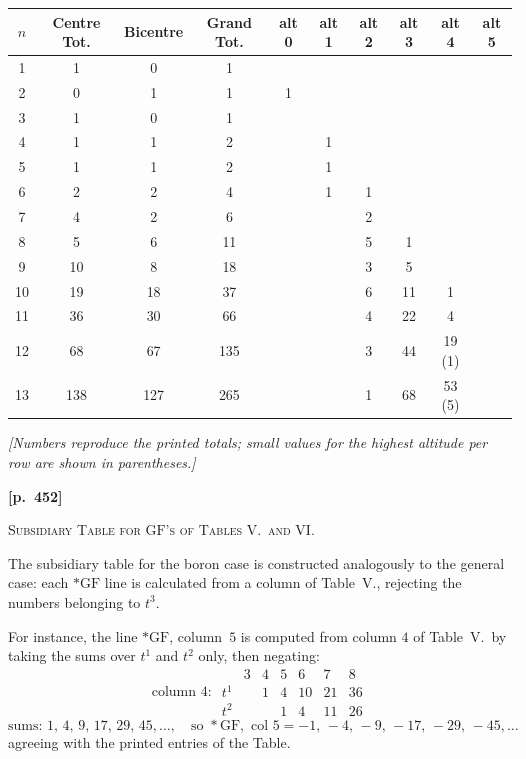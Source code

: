 \documentclass[11pt,a4paper]{article}
\providecommand{\GF}{\mathrm{GF}}
\begin{document}
\begin{center}
\begin{tabular}{c|cc|c|cccccc}
$n$ & Centre Tot. & Bicentre & Grand Tot. & alt 0 & alt 1 & alt 2 & alt 3 & alt 4 & alt 5\\\hline
1 & 1 & 0 & 1 & & & & & &\\
2 & 0 & 1 & 1 & 1 & & & & &\\
3 & 1 & 0 & 1 & & & & & &\\
4 & 1 & 1 & 2 & & 1 & & & &\\
5 & 1 & 1 & 2 & & 1 & & & &\\
6 & 2 & 2 & 4 & & 1 & 1 & & &\\
7 & 4 & 2 & 6 & & & 2 & & &\\
8 & 5 & 6 & 11 & & & 5 & 1 & &\\
9 & 10 & 8 & 18 & & & 3 & 5 & &\\
10 & 19 & 18 & 37 & & & 6 & 11 & 1 &\\
11 & 36 & 30 & 66 & & & 4 & 22 & 4 &\\
12 & 68 & 67 & 135 & & & 3 & 44 & 19 \quad (1)\\
13 & 138 & 127 & 265 & & & 1 & 68 & 53 \quad (5)
\end{tabular}
\end{center}

\noindent\textit{[Numbers reproduce the printed totals; small values for the highest altitude per row are shown in parentheses.]}

\newpage
\noindent\textbf{[p.~452]}\quad
\begin{center}
\textsc{Subsidiary Table for $\GF$'s of Tables V.\ and VI.}
\end{center}

\noindent The subsidiary table for the boron case is constructed analogously to the general case: each $*\GF$ line is calculated from a column of Table~V., rejecting the numbers belonging to $t^{3}$.

For instance, the line $*\GF$, column~$5$ is computed from column $4$ of Table~V.\ by taking the sums over $t^{1}$ and $t^{2}$ only, then negating:
\[
\text{column 4: }
\begin{array}{l|cccccc}
& 3 & 4 & 5 & 6 & 7 & 8\\\hline
t^{1} & & 1 & 4 & 10 & 21 & 36\\
t^{2} & & & 1 & 4 & 11 & 26
\end{array}
\]
\[
\text{sums: } 1,\,4,\,9,\,17,\,29,\,45,\ldots,
\quad\text{so }*\GF,\text{ col }5 = -1,\,-4,\,-9,\,-17,\,-29,\,-45,\ldots
\]
agreeing with the printed entries of the Table.
\end{document}
